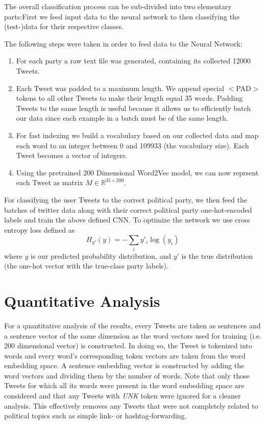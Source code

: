 \documentclass[10pt, oneside]{article}
\begin{document}
\begin{multicols}{2}
The overall classification process can be sub-divided into two elementary parts:First we feed input data to the neural network to then classifying the (test-)data for their respective classes.

The following steps were taken in order to feed data to the Neural Network:

\begin{enumerate}
\item For each party a raw text file was generated, containing its collected 12000 Tweets.
\item Each Tweet was padded to a maximum length. We append special $<$PAD$>$ tokens to all other Tweets to make their length equal 35 words. Padding Tweets to the same length is useful because it allows us to efficiently batch our data since each example in a batch must be of the same length.
\item For fast indexing we build a vocabulary based on our collected data and map each word to an integer between 0 and 109933 (the vocabulary size). Each Tweet becomes a vector of integers.
\item Using the pretrained 200 Dimensional Word2Vec model, we can now reprsent each Tweet as matrix $M \in \mathbb{R}^{35 \times 200}$.
\end{enumerate}

For classifying the user Tweets to the correct political party, we then feed the batches of twitter data along with their correct political party one-hot-encoded labels and train the above defined CNN. To optimize the network we use cross entropy loss defined as
\begin{equation}
	H_{y'}(y) = - \sum_{i} y'_{i} \log (y_{i})
\end{equation}
where $y$ is our predicted probability distribution, and $y'$ is the true distribution (the one-hot vector with the true-class party labels). 


\section{Quantitative Analysis}

For a quantitative analysis of the results, every Tweets are taken as sentences and a sentence vector of the same dimension as the word vectors used for training (i.e. 200 dimensional vector) is constructed. In doing so, the Tweet is tokenized into words and every word's corresponding token vectors are taken from the word embedding space. A sentence embedding vector is constructed by adding the word vectors and dividing them by the number of words. Note that only those Tweets for which all its words were present in the word embedding space are considered and that any Tweets with \emph{UNK} token were ignored for a cleaner analysis. This effectively removes any Tweets that were not completely related to political topics such as simple link- or hashtag-forwarding. 


\end{multicols}
\end{document}
